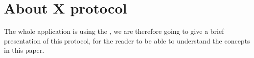 \chapter{About X protocol}
The whole application is using the \cite{x-protocol}, 
we are therefore going to give a brief presentation of this protocol, 
for the reader to be able to understand the concepts in this paper.
%

%

%

%

%

